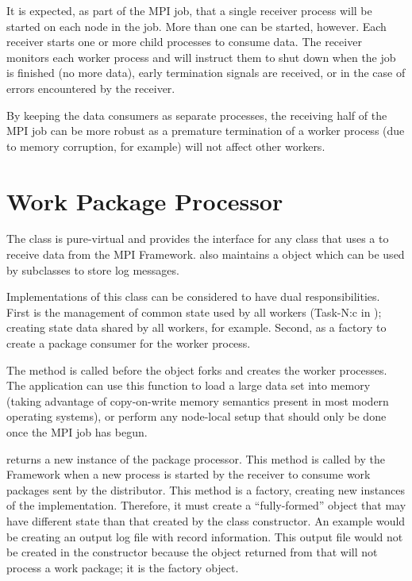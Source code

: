 It is expected, as part of the MPI job, that a single receiver process
will be started on each node in the job. More than one can be started,
however. Each receiver starts one or more child processes to
consume data. The receiver monitors each worker process and
will instruct them to shut down when the job is finished (no more data),
early termination signals are received, or in the case of errors
encountered by the receiver.

By keeping the data consumers as separate processes, the receiving half
of the MPI job can be more robust as a premature termination of a worker
process (due to memory corruption, for example) will not affect other
workers.

\section{Work Package Processor}
\label{sec-workpackageprocessor}

The  class is pure-virtual and provides the
interface for any class that uses a  to receive data from
the MPI Framework.
 also maintains a  object which
can be used by subclasses to store log messages.

Implementations of this class can be considered to have dual responsibilities.
First is the management of common state used by all workers (Task-N:c in
); creating state data shared by all workers, for
example.
Second, as a factory to create a package consumer for the worker process.

The  method is called before the 
object forks and creates the worker processes. The application can use this
function to load a large data set into memory (taking advantage of copy-on-write
memory semantics present in most modern operating systems), or perform any
node-local setup that should only be done once the MPI job has begun.

 returns a new instance of the package processor.
This method is called by the Framework when a new process is started by the
receiver to consume work packages sent by the distributor. This method is a
factory, creating new instances of the 
implementation. Therefore, it must create a ``fully-formed'' object that may
have different state than that created by the class constructor. An example
would be creating an output log file with record information.
This output file would not be created in the constructor because the
object returned from that will not process a work package; it is the factory
object.

